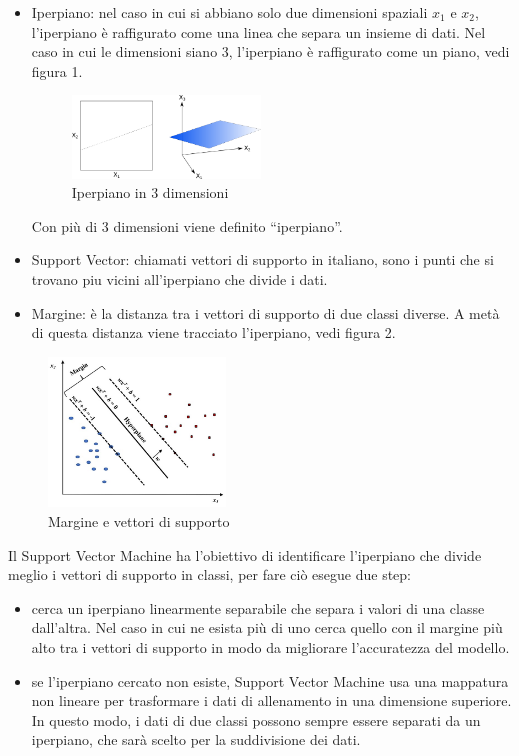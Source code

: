 \documentclass[12pt,italian]{report}
\begin{document}
\begin{itemize}
	\item Iperpiano: nel caso in cui si abbiano solo due dimensioni spaziali $x_1$ e $x_2$, l'iperpiano è raffigurato come una linea che separa un insieme di dati. Nel caso in cui le dimensioni siano 3, l'iperpiano è raffigurato come un piano, vedi figura 1.
	\begin{figure}[h]
		\centering
		\includegraphics[width = 50mm]{immagini/Iperpiano-3-dimensioni}
		\caption{Iperpiano in 3 dimensioni}
	\end{figure}
	Con più di 3 dimensioni viene definito ``iperpiano''.
	\item Support Vector: chiamati vettori di supporto in italiano, sono i punti che si trovano piu vicini all'iperpiano che divide i dati.
	\item Margine: è la distanza tra i vettori di supporto di due classi diverse. A metà di questa distanza viene tracciato l'iperpiano, vedi figura 2.
\end{itemize}

\begin{figure}[h]
	\centering
	\includegraphics[width = 47mm]{immagini/svc}
	\caption{Margine e vettori di supporto}
\end{figure}

Il Support Vector Machine ha l'obiettivo di identificare l'iperpiano che divide meglio i vettori di supporto in classi, per fare ciò esegue due step:

\begin{itemize}
	\item cerca un iperpiano linearmente separabile che separa i valori di una classe dall'altra. Nel caso in cui ne esista più di uno cerca quello con il margine più alto tra i vettori di supporto in modo da migliorare l'accuratezza del modello.
	\item se l'iperpiano cercato non esiste, Support Vector Machine usa una mappatura non lineare per trasformare i dati di allenamento in una dimensione superiore. In questo modo, i dati di due classi possono sempre essere separati da un iperpiano, che sarà scelto per la suddivisione dei dati.
\end{itemize}
\end{document}

